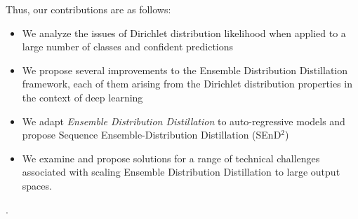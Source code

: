Thus, our contributions are as follows:
\begin{itemize}
    \item We analyze the issues of Dirichlet distribution likelihood when applied to a large number of classes and confident predictions
    \item We propose several improvements to the {Ensemble Distribution Distillation} framework, each of them arising from the Dirichlet distribution properties in the context of deep learning
    \item We adapt \emph{Ensemble Distribution Distillation} to auto-regressive models and propose {Sequence Ensemble-Distribution Distillation} (SEnD$^2$)
    \item We examine and propose solutions for a range of technical challenges associated with scaling {Ensemble Distribution Distillation} to large output spaces. 
\end{itemize}.